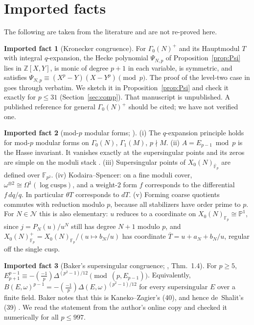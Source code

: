 \documentclass[11pt,a4paper]{article}
\numberwithin{equation}{section}
\theoremstyle{definition}
\newtheorem{fact}{Imported fact}
\theoremstyle{remark}
\newcommand{\Fp}{\mathbb F_p}
\newcommand{\Fq}{\mathbb F_{p^2}}
\newcommand{\Fb}{\overline{\mathbb F}_p}
\newcommand{\Z}{\mathbb Z}
\newcommand{\Lp}[1]{\left(\frac{#1}{p}\right)}
\begin{document}
\section{Imported facts}\label{sec:imports}
The following are taken from the literature and are not re-proved here.

\begin{fact}[Kronecker congruence]\label{fact:kron}
For $\Gamma_0(N)^+$ and its Hauptmodul $T$ with integral $q$-expansion, the Hecke polynomial
$\Psi_{N,p}$ of Proposition~\ref{prop:Psi} lies in $\Z[X,Y]$, is monic of degree $p+1$ in each
variable, is symmetric, and satisfies $\Psi_{N,p}\equiv(X^p-Y)(X-Y^p)\pmod p$. The proof of the
level-two case in \citet[Prop.~2.1]{Jordan26} goes through verbatim. We sketch it in
Proposition~\ref{prop:Psi} and check it exactly for $p\le31$ (Section~\ref{sec:comp}). That
manuscript is unpublished. A published reference for general $\Gamma_0(N)^+$ should be cited; we have
not verified one.
\end{fact}

\begin{fact}[mod-$p$ modular forms; \citealp{Katz73,Serre73,KM85}]\label{fact:modp}
(i) The $q$-expansion principle holds for mod-$p$ modular forms on $\Gamma_0(N)$, $\Gamma_1(M)$, $p\nmid M$.
(ii) $A=E_{p-1}\bmod p$ is the Hasse invariant. It vanishes exactly at the supersingular points and its zeros are simple on the moduli stack \citep{Igusa58}.
(iii) Supersingular points of $X_0(N)_{\Fb}$ are defined over $\Fq$.
(iv) Kodaira--Spencer: on a fine moduli cover, $\omega^{\otimes2}\cong\Omega^1(\log\text{cusps})$, and
a weight-$2$ form $f$ corresponds to the differential $f\,dq/q$. In particular $\theta T$ corresponds to $dT$.
(v) Forming coarse quotients commutes with reduction modulo $p$, because all stabilizers have order prime to $p$. For
$N\in\mathcal N$ this is also elementary: $u$ reduces to a coordinate on $X_0(N)_{\Fp}\cong\mathbb P^1$, since
$j=P_N(u)/u^N$ still has degree $N+1$ modulo $p$, and $X_0(N)^+_{\Fp}=X_0(N)_{\Fp}/(u\mapsto b_N/u)$ has coordinate
$\overline T=u+a_N+b_N/u$, regular off the single cusp.
\end{fact}

\begin{fact}[Baker's supersingular congruence; \citealp{Baker98}, Thm.~1.4]\label{fact:baker}
For $p\ge5$, $E_{p+1}^{p-1}\equiv-\Lp{-1}\Delta^{(p^2-1)/12}\pmod{(p,E_{p-1})}$. Equivalently,
$B(E,\omega)^{p-1}=-\Lp{-1}\Delta(E,\omega)^{(p^2-1)/12}$ for every supersingular $E$ over a finite field.
Baker notes that this is Kaneko--Zagier's (40), and hence de~Shalit's (39) \citep[\S10]{KZ98}. We read the
statement from the author's online copy and checked it numerically for all $p\le997$.
\end{fact}
\end{document}
